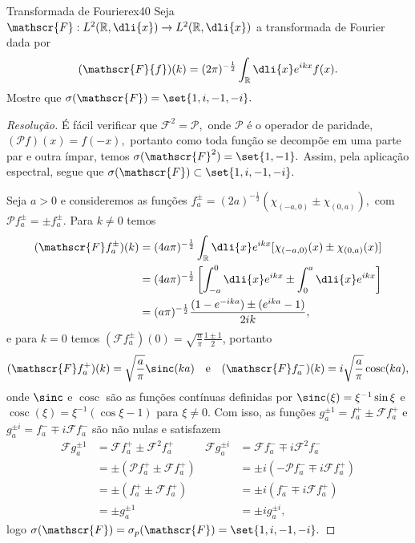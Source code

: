 \begin{exercício}{Transformada de Fourier}{ex40}
  Seja \(\mathscr{F} : L^2(\mathbb{R}, \dli{x}) \to L^2(\mathbb{R}, \dli{x})\) a transformada de Fourier dada por
  \begin{equation*}
    (\mathscr{F}{f})(k) = (2\pi)^{-\frac12} \int_{\mathbb{R}}\dli{x} e^{ikx}f(x).
  \end{equation*}
  Mostre que \(\sigma(\mathscr{F}) = \set{1,i,-1,-i}.\)
\end{exercício}
\begin{proof}[Resolução]
  É fácil verificar que \(\mathscr{F}^2 = \mathscr{P},\) onde \(\mathscr{P}\) é o operador de paridade, \((\mathscr{P}f)(x) = f(-x),\) portanto como toda função se decompõe em uma parte par e outra ímpar, temos \(\sigma(\mathscr{F}^2) = \set{1,-1}.\) Assim, pela aplicação espectral, segue que \(\sigma(\mathscr{F}) \subset \set{1, i, -1, -i}.\)

  Seja \(a > 0\) e consideremos as funções \(f^\pm_a = (2a)^{-\frac12}(\chi_{(-a,0)} \pm \chi_{(0,a)}),\) com \(\mathscr{P}f^\pm_a = \pm f^\pm_a.\) Para \(k \neq 0\) temos
  \begin{align*}
    (\mathscr{F}f^\pm_a)(k) &= (4a\pi)^{-\frac12}\int_{\mathbb{R}}\dli{x} e^{ikx} [\chi_{(-a,0)}(x) \pm \chi_{(0, a)}(x)]\\
                            &= (4a \pi)^{-\frac12} \left[\int_{-a}^{0}\dli{x} e^{ikx} \pm \int_{0}^a\dli{x} e^{ikx}\right]\\
                            &= (a \pi)^{-\frac12} \frac{(1 - e^{-ika}) \pm (e^{ika} - 1)}{2ik},
  \end{align*}
  e para \(k = 0\) temos \((\mathscr{F}f^\pm_a)(0) = \sqrt{\frac{a}{\pi}}\frac{1 \pm 1}{2}\), portanto
  \begin{equation*}
    (\mathscr{F}f_a^+)(k) = \sqrt{\frac{a}{\pi}} \sinc(ka)\quad\text{e}\quad(\mathscr{F}f_a^-)(k) = i\sqrt{\frac{a}{\pi}} \operatorname{cosc}(ka),
  \end{equation*}
  onde \(\sinc\) e \(\operatorname{cosc}\) são as funções contínuas definidas por \(\sinc(\xi) = \xi^{-1}\sin{\xi}\) e \(\operatorname{cosc}(\xi) = \xi^{-1}(\cos\xi - 1)\) para \(\xi \neq 0.\) Com isso, as funções \(g_a^{\pm1} = f_a^{+} \pm \mathscr{F}f_a^{+}\) e \(g_{a}^{\pm i} = f_a^{-} \mp i \mathscr{F} f_a^{-}\) são não nulas e satisfazem
  \begin{align*}
    \mathscr{F}g_a^{\pm1} &= \mathscr{F} f_a^+ \pm \mathscr{F}^2 f_a^+&
    \mathscr{F}g_a^{\pm i} &= \mathscr{F} f_a^- \mp i\mathscr{F}^2 f_a^-\\
                          &= \pm \left(\mathscr{P}f_a^+ \pm \mathscr{F} f_a^+\right)&
                          &= \pm i \left(-\mathscr{P}f_a^- \mp i\mathscr{F} f_a^+\right)\\
                          &= \pm \left(f_a^+ \pm \mathscr{F} f_a^+\right)&
                          &= \pm i \left(f_a^- \mp i\mathscr{F} f_a^+\right)\\
                          &= \pm g_a^{\pm 1}&
                          &= \pm i g_a^{\pm i},
  \end{align*}
  logo \(\sigma(\mathscr{F}) = \sigma_p(\mathscr{F}) = \set{1, i, -1, -i}.\)
\end{proof}
